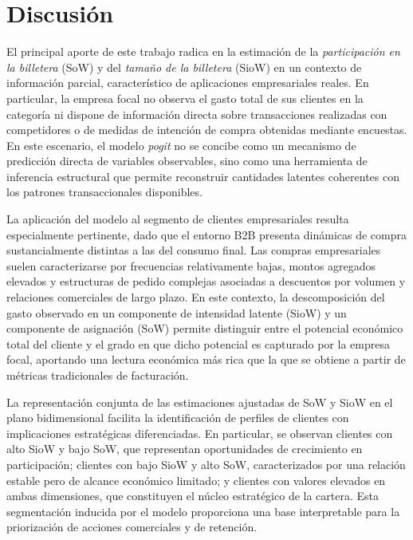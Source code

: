 
\section{Discusión}

El principal aporte de este trabajo radica en la estimación de la \emph{participación en la billetera} (SoW) y del \emph{tamaño de la billetera} (SioW) en un contexto de información parcial, característico de aplicaciones empresariales reales. En particular, la empresa focal no observa el gasto total de sus clientes en la categoría ni dispone de información directa sobre transacciones realizadas con competidores o de medidas de intención de compra obtenidas mediante encuestas. En este escenario, el modelo \emph{pogit} no se concibe como un mecanismo de predicción directa de variables observables, sino como una herramienta de inferencia estructural que permite reconstruir cantidades latentes coherentes con los patrones transaccionales disponibles.

La aplicación del modelo al segmento de clientes empresariales resulta especialmente pertinente, dado que el entorno B2B presenta dinámicas de compra sustancialmente distintas a las del consumo final. Las compras empresariales suelen caracterizarse por frecuencias relativamente bajas, montos agregados elevados y estructuras de pedido complejas asociadas a descuentos por volumen y relaciones comerciales de largo plazo. En este contexto, la descomposición del gasto observado en un componente de intensidad latente (SioW) y un componente de asignación (SoW) permite distinguir entre el potencial económico total del cliente y el grado en que dicho potencial es capturado por la empresa focal, aportando una lectura económica más rica que la que se obtiene a partir de métricas tradicionales de facturación.

La representación conjunta de las estimaciones ajustadas de SoW y SioW en el plano bidimensional facilita la identificación de perfiles de clientes con implicaciones estratégicas diferenciadas. En particular, se observan clientes con alto SioW y bajo SoW, que representan oportunidades de crecimiento en participación; clientes con bajo SioW y alto SoW, caracterizados por una relación estable pero de alcance económico limitado; y clientes con valores elevados en ambas dimensiones, que constituyen el núcleo estratégico de la cartera. Esta segmentación inducida por el modelo proporciona una base interpretable para la priorización de acciones comerciales y de retención.

